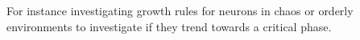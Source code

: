 For instance investigating growth rules for neurons in chaos or orderly
environments to investigate if they trend towards a critical phase.